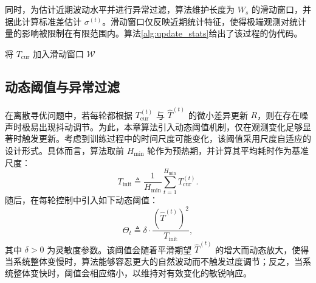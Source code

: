 \documentclass[master, vlined]{DissertUESTC}
\begin{document}
	同时，为估计近期波动水平并进行异常过滤，算法维护长度为 $W_s$ 的滑动窗口，并据此计算标准差估计 $\sigma^{(t)}$。滑动窗口仅反映近期统计特征，使得极端观测对统计量的影响被限制在有限范围内。算法\ref{alg:update_stats}给出了该过程的伪代码。

	\begin{algorithm}[htb]
		\caption{统计信息更新算法}
		\label{alg:update_stats}
		\BlankLine
		将 $T_{\text{cur}}$ 加入滑动窗口 $\mathcal{W}$ \\
	\end{algorithm}

	\subsection{动态阈值与异常过滤}

	在离散寻优问题中，若每轮都根据 $T_{\mathrm{cur}}^{(t)}$ 与 $\hat{T}^{(t)}$ 的微小差异更新 $R$，则在存在噪声时极易出现抖动调节。为此，本章算法引入动态阈值机制，仅在观测变化足够显著时触发更新。考虑到训练过程中的时间尺度可能变化，该阈值采用尺度自适应的设计形式。具体而言，算法取前 $H_{\min}$ 轮作为预热期，并计算其平均耗时作为基准尺度：
	\begin{equation}
		T_{\mathrm{init}} \triangleq \frac{1}{H_{\min}}\sum_{t=1}^{H_{\min}} T_{\mathrm{cur}}^{(t)}.
	\label{eq:Tinit_alg}
	\end{equation}
	随后，在每轮控制中引入如下动态阈值：
	\begin{equation}
		\Theta_t \triangleq \delta \cdot \frac{\left(\hat{T}^{(t)}\right)^2}{T_{\mathrm{init}}},
	\label{eq:theta_alg}
	\end{equation}
	其中 $\delta>0$ 为灵敏度参数。该阈值会随着平滑期望 $\hat{T}^{(t)}$ 的增大而动态放大，使得当系统整体变慢时，算法能够容忍更大的自然波动而不触发过度调节；反之，当系统整体变快时，阈值会相应缩小，以维持对有效变化的敏锐响应。
\end{document}
